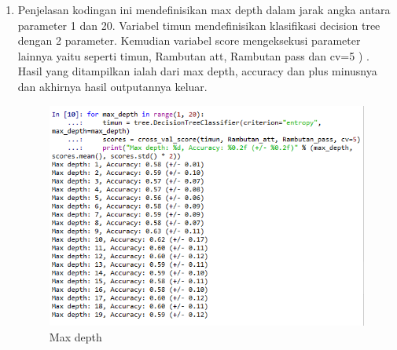 \begin{enumerate}
\item Penjelasan kodingan ini mendefinisikan max depth dalam jarak angka antara parameter 1 dan 20. Variabel timun mendefinisikan klasifikasi decision tree dengan 2 parameter. Kemudian variabel score mengeksekusi parameter lainnya yaitu seperti timun, Rambutan att, Rambutan pass dan cv=5 ) . Hasil yang ditampilkan ialah dari max depth, accuracy dan plus minusnya dan akhirnya hasil outputannya keluar.
\begin{figure}[ht]
\centering
\includegraphics[scale=0.5]{figures/no10.png}
\caption{Max depth}
\label{Hasil}
\end{figure}
\end{enumerate}

